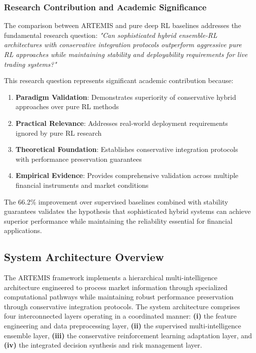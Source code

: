 \documentclass[10pt,twocolumn]{article}
\begin{document}
\subsubsection{Research Contribution and Academic Significance}

The comparison between ARTEMIS and pure deep RL baselines addresses the fundamental research question: \textit{"Can sophisticated hybrid ensemble-RL architectures with conservative integration protocols outperform aggressive pure RL approaches while maintaining stability and deployability requirements for live trading systems?"}

This research question represents significant academic contribution because:

\begin{enumerate}[itemsep=1pt]
\item \textbf{Paradigm Validation}: Demonstrates superiority of conservative hybrid approaches over pure RL methods
\item \textbf{Practical Relevance}: Addresses real-world deployment requirements ignored by pure RL research
\item \textbf{Theoretical Foundation}: Establishes conservative integration protocols with performance preservation guarantees
\item \textbf{Empirical Evidence}: Provides comprehensive validation across multiple financial instruments and market conditions
\end{enumerate}

The 66.2\% improvement over supervised baselines combined with stability guarantees validates the hypothesis that sophisticated hybrid systems can achieve superior performance while maintaining the reliability essential for financial applications.

\subsection{System Architecture Overview}

The ARTEMIS framework implements a hierarchical multi-intelligence architecture engineered to process market information through specialized computational pathways while maintaining robust performance preservation through conservative integration protocols. The system architecture comprises four interconnected layers operating in a coordinated manner: \textbf{(i)} the feature engineering and data preprocessing layer, \textbf{(ii)} the supervised multi-intelligence ensemble layer, \textbf{(iii)} the conservative reinforcement learning adaptation layer, and \textbf{(iv)} the integrated decision synthesis and risk management layer.
\end{document}

